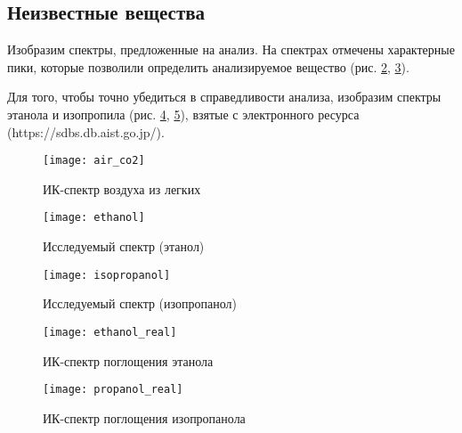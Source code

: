 \subsection{Неизвестные вещества}
Изобразим спектры, предложенные на анализ. На спектрах отмечены характерные пики, которые позволили определить анализируемое вещество (рис. \ref{ethanol}, \ref{isopropanol}).

Для того, чтобы точно убедиться в справедливости анализа, изобразим спектры этанола и изопропила (рис. \ref{ethanol_real}, \ref{propanol_real}), взятые с электронного ресурса (https://sdbs.db.aist.go.jp/).
\vspace{5cm}
\begin{figure}[h!]
	\centering
	\texttt{[image: air\_co2]}
	\caption{ИК-спектр воздуха из легких}
	\label{air_co2}
\end{figure}
\begin{figure}[h!]
	\centering
	\texttt{[image: ethanol]}
	\caption{Исследуемый спектр (этанол)}
	\label{ethanol}
\end{figure}
\begin{figure}[h!]
	\centering
	\texttt{[image: isopropanol]}
	\caption{Исследуемый спектр (изопропанол)}
	\label{isopropanol}
\end{figure}
\begin{figure}[h!]
	\centering
	\texttt{[image: ethanol\_real]}
	\caption{ИК-спектр поглощения этанола}
	\label{ethanol_real}
\end{figure}
\begin{figure}[h!]
	\centering
	\texttt{[image: propanol\_real]}
	\caption{ИК-спектр поглощения изопропанола}
	\label{propanol_real}
\end{figure}
